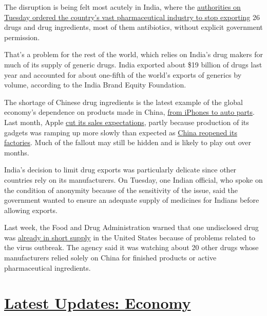 The disruption is being felt most acutely in India, where the
\href{https://dgft.gov.in/sites/default/files/Noti\%2050_0.pdf}{authorities
on Tuesday ordered the country's vast pharmaceutical industry to stop
exporting} 26 drugs and drug ingredients, most of them antibiotics,
without explicit government permission.

That's a problem for the rest of the world, which relies on India's drug
makers for much of its supply of generic drugs. India exported about
\$19 billion of drugs last year and accounted for about one-fifth of the
world's exports of generics by volume, according to the India Brand
Equity Foundation.

The shortage of Chinese drug ingredients is the latest example of the
global economy's dependence on products made in China,
\href{https://www.nytimes.com/2020/03/02/business/economy/china-coronavirus-economy.html}{from
iPhones to auto parts}. Last month, Apple
\href{https://www.nytimes.com/2020/02/17/technology/apple-coronavirus-economy.html}{cut
its sales expectations}, partly because production of its gadgets was
ramping up more slowly than expected as
\href{https://www.nytimes.com/2020/02/17/business/china-coronavirus-economy.html}{China
reopened its factories}. Much of the fallout may still be hidden and is
likely to play out over months.

India's decision to limit drug exports was particularly delicate since
other countries rely on its manufacturers. On Tuesday, one Indian
official, who spoke on the condition of anonymity because of the
sensitivity of the issue, said the government wanted to ensure an
adequate supply of medicines for Indians before allowing exports.

Last week, the Food and Drug Administration warned that one undisclosed
drug was
\href{https://www.nytimes.com/2020/02/28/health/drug-coronavirus-shortage.html}{already
in short supply} in the United States because of problems related to the
virus outbreak. The agency said it was watching about 20 other drugs
whose manufacturers relied solely on China for finished products or
active pharmaceutical ingredients.

\hypertarget{latest-updates-economy}{%
\section{\texorpdfstring{\href{https://www.nytimes.com/live/2020/07/31/business/stock-market-today-coronavirus?action=click\&pgtype=Article\&state=default\&region=MAIN_CONTENT_1\&context=storylines_live_updates}{Latest
Updates:
Economy}}{Latest Updates: Economy}}\label{latest-updates-economy}}

